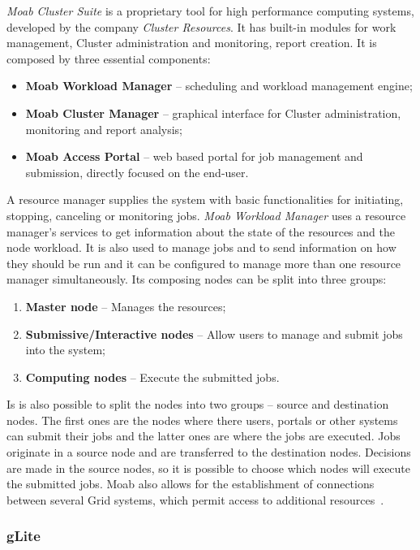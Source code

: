 \textit{Moab Cluster Suite} is a proprietary tool for high performance computing systems, developed by the company \textit{Cluster Resources}. It has built-in modules for work management, Cluster administration and monitoring, report creation. It is composed by three essential components:
\begin{itemize}
\item \textbf{Moab Workload Manager} -- scheduling and workload management engine;
\item \textbf{Moab Cluster Manager} -- graphical interface for Cluster administration, monitoring and report analysis;
\item \textbf{Moab Access Portal} -- web based portal for job management and submission, directly focused on the end-user.
\end{itemize}

A resource manager supplies the system with basic functionalities for initiating, stopping, canceling or monitoring jobs. \textit{Moab Workload Manager} uses a resource manager's services to get information about the state of the resources and the node workload. It is also used to manage jobs and to send information on how they should be run and it can be configured to manage more than one resource manager simultaneously.
Its composing nodes can be split into three groups:
\begin{enumerate}
\item \textbf{Master node} -- Manages the resources;
\item \textbf{Submissive/Interactive nodes} -- Allow users to manage and submit jobs into the system;
\item \textbf{Computing nodes} -- Execute the submitted jobs.
\end{enumerate}

Is is also possible to split the nodes into two groups -- source and destination nodes. The first ones are the nodes where there users, portals or other systems can submit their jobs and the latter ones are where the jobs are executed. Jobs originate in a source node and are transferred to the destination nodes. Decisions are made in the source nodes, so it is possible to choose which nodes will execute the submitted jobs.
Moab also allows for the establishment of connections between several Grid systems, which permit access to additional resources~\cite{jorge-ruao, moab}.

\subsubsection{gLite}\label{glite}

